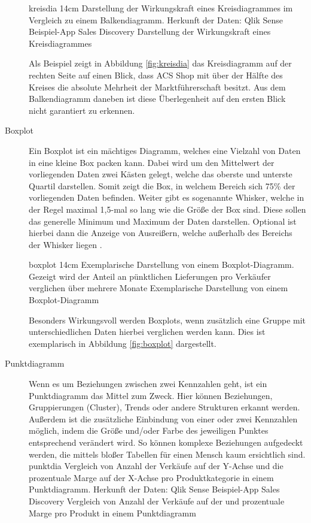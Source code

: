 \begin{description}
\bild
{kreisdia}
{14cm}
{Darstellung der Wirkungskraft eines Kreisdiagrammes im Vergleich zu einem Balkendiagramm. Herkunft der Daten: Qlik Sense Beispiel-App \glqq Sales Discovery\grqq}
{Darstellung der Wirkungskraft eines Kreisdiagrammes}

Als Beispiel zeigt in Abbildung \ref{fig:kreisdia} das Kreisdiagramm auf der rechten Seite auf einen Blick, dass \glqq ACS Shop\grqq{} mit über der Hälfte des Kreises die absolute Mehrheit der Marktführerschaft besitzt.
Aus dem Balkendiagramm daneben ist diese Überlegenheit auf den ersten Blick nicht garantiert zu erkennen.

\item[Boxplot] Ein Boxplot ist ein mächtiges Diagramm, welches eine Vielzahl von Daten in eine kleine \glqq Box\grqq{} packen kann.
Dabei wird um den Mittelwert der vorliegenden Daten zwei Kästen gelegt, welche das oberste und unterste Quartil darstellen.
Somit zeigt die \glqq Box\grqq{}, in welchem Bereich sich 75\% der vorliegenden Daten befinden.
Weiter gibt es sogenannte \glqq Whisker\grqq{}, welche in der Regel maximal 1,5-mal so lang wie die Größe der Box sind. 
Diese sollen das generelle Minimum und Maximum der Daten darstellen.
Optional ist hierbei dann die Anzeige von Ausreißern, welche außerhalb des Bereichs der Whisker liegen \cite[S.59]{FischerStabel.2018}.

\bild
{boxplot}
{14cm}
{Exemplarische Darstellung von einem Boxplot-Diagramm. Gezeigt wird der Anteil an pünktlichen Lieferungen pro Verkäufer verglichen über mehrere Monate}
{Exemplarische Darstellung von einem Boxplot-Diagramm}

Besonders Wirkungsvoll werden Boxplots, wenn zusätzlich eine Gruppe mit unterschiedlichen Daten hierbei verglichen werden kann.
Dies ist exemplarisch in Abbildung \ref{fig:boxplot} dargestellt.
\item[Punktdiagramm] Wenn es um Beziehungen zwischen zwei Kennzahlen geht, ist ein Punktdiagramm das Mittel zum Zweck.
Hier können Beziehungen, Gruppierungen (Cluster), Trends oder andere Strukturen erkannt werden.
Außerdem ist die zusätzliche Einbindung von einer oder zwei Kennzahlen möglich, indem die Größe und/oder Farbe des jeweiligen Punktes entsprechend verändert wird.
So können komplexe Beziehungen aufgedeckt werden, die mittels bloßer Tabellen für einen Mensch kaum ersichtlich sind.
\bildbreit
{punktdia}
{Vergleich von Anzahl der Verkäufe auf der Y-Achse und die prozentuale Marge auf der X-Achse pro Produktkategorie in einem Punktdiagramm. Herkunft der Daten: Qlik Sense Beispiel-App \glqq Sales Discovery\grqq}
{Vergleich von Anzahl der Verkäufe auf der und prozentuale Marge pro Produkt in einem Punktdiagramm}


\end{description}
